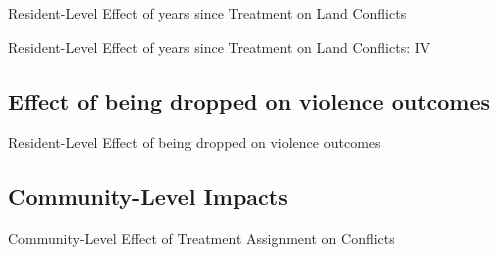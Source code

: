 \documentclass[10pt]{article}
\begin{document}
\begin{landscape}
\begin{table}[H]
\caption{Resident-Level Effect of years since Treatment on Land Conflicts}
\begin{center}
\begin{adjustbox}{max height = .6\textheight}

\end{adjustbox}
\end{center}
\end{table}

\begin{table}[H]
\caption{Resident-Level Effect of years since Treatment on Land Conflicts: IV}
\begin{center}
\begin{adjustbox}{max width = \textwidth}

\end{adjustbox}
\end{center}
\end{table}
\end{landscape}


\subsection{Effect of being dropped on violence outcomes}
\begin{table}[H]
\caption{Resident-Level Effect of being dropped on violence outcomes}
\label{conflict_adj_p_dropped}
\begin{center}
\begin{adjustbox}{max width = \textwidth}

\end{adjustbox}
\end{center}
\end{table}

\clearpage

\subsection{Community-Level Impacts}

\begin{table}[H]
\caption{Community-Level Effect of Treatment Assignment on Conflicts}
\begin{center}
\begin{adjustbox}{max width = \textwidth}

\end{adjustbox}
\end{center}
\end{table}
\end{document}
